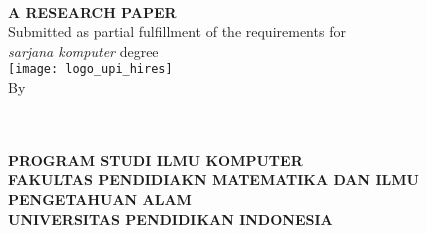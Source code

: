 \begin{titlepage}
    \begin{center}

        \begin{doublespace}
            \textbf{\MakeUppercase{\judul}}\\[1cm]
        \end{doublespace}
        \textbf{\MakeUppercase{A Research Paper}}\\[1cm]
        Submitted as partial fulfillment of the requirements for\\
        \textit{sarjana komputer} degree\\[1cm]

        \texttt{[image: logo\_upi\_hires]}\\[1cm]
        By\\
        \penulis\\
        \nim\\
        \vfill

        \textbf{\MakeUppercase{program studi ilmu komputer}}\\
        \textbf{ \MakeUppercase{fakultas pendidiakn matematika dan ilmu pengetahuan alam}}\\
        \textbf{\MakeUppercase{UNIVERSITAS PENDIDIKAN INDONESIA}}\\
        \textbf{\the\year{}}\\
    \end{center}
\end{titlepage}

